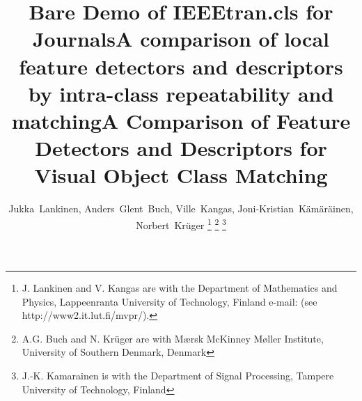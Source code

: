 \documentclass[journal]{IEEEtran}
\begin{document}
%
\title{Bare Demo of IEEEtran.cls for Journals}
\title{A comparison of local feature detectors and descriptors by intra-class repeatability and matching}
\title{A Comparison of Feature Detectors and Descriptors for Visual Object Class Matching}

%
%
%

\author{Jukka~Lankinen,
Anders~Glent~Buch,
Ville~Kangas,
Joni-Kristian~K\"am\"ar\"ainen,
Norbert~Kr\"uger%
\thanks{J. Lankinen and V. Kangas are with the Department of Mathematics and Physics,
Lappeenranta University of Technology, Finland e-mail: (see http://www2.it.lut.fi/mvpr/).}%
\thanks{A.G. Buch and N. Kr\"uger are with M{\ae}rsk McKinney M{\o}ller Institute, University of Southern Denmark, Denmark}%
\thanks{J.-K. Kamarainen is with the Department of Signal Processing, Tampere University of Technology, Finland}}

% 
%
\end{document}
